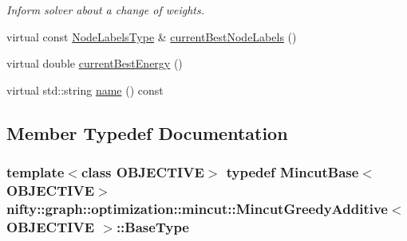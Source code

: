 \begin{DoxyCompactItemize}
\begin{DoxyCompactList}\small\item\em Inform solver about a change of weights. \end{DoxyCompactList}\item 
virtual const \hyperlink{classnifty_1_1graph_1_1optimization_1_1mincut_1_1MincutGreedyAdditive_a693f650b319d1fe1c9ce2cc256f4c7d7}{Node\+Labels\+Type} \& \hyperlink{classnifty_1_1graph_1_1optimization_1_1mincut_1_1MincutGreedyAdditive_a25044806eeb448847cbe04934e93df5d}{current\+Best\+Node\+Labels} ()
\item 
virtual double \hyperlink{classnifty_1_1graph_1_1optimization_1_1mincut_1_1MincutGreedyAdditive_a0476f8bc44272bdb2ede5a8af4feff46}{current\+Best\+Energy} ()
\item 
virtual std\+::string \hyperlink{classnifty_1_1graph_1_1optimization_1_1mincut_1_1MincutGreedyAdditive_a9afaadc1ecba0201c32f93195cc60162}{name} () const 
\end{DoxyCompactItemize}


\subsection{Member Typedef Documentation}
\hypertarget{classnifty_1_1graph_1_1optimization_1_1mincut_1_1MincutGreedyAdditive_a5864f86ae8949a1a6a2074cb031e7973}{}
\subsubsection[{Base\+Type}]{\setlength{\rightskip}{0pt plus 5cm}template$<$class O\+B\+J\+E\+C\+T\+I\+V\+E$>$ typedef {\bf Mincut\+Base}$<$O\+B\+J\+E\+C\+T\+I\+V\+E$>$ {\bf nifty\+::graph\+::optimization\+::mincut\+::\+Mincut\+Greedy\+Additive}$<$ O\+B\+J\+E\+C\+T\+I\+V\+E $>$\+::{\bf Base\+Type}}\label{classnifty_1_1graph_1_1optimization_1_1mincut_1_1MincutGreedyAdditive_a5864f86ae8949a1a6a2074cb031e7973}
\hypertarget{classnifty_1_1graph_1_1optimization_1_1mincut_1_1MincutGreedyAdditive_a2a20d815b0e3c083ed85bcb4c1b60bc6}{}
